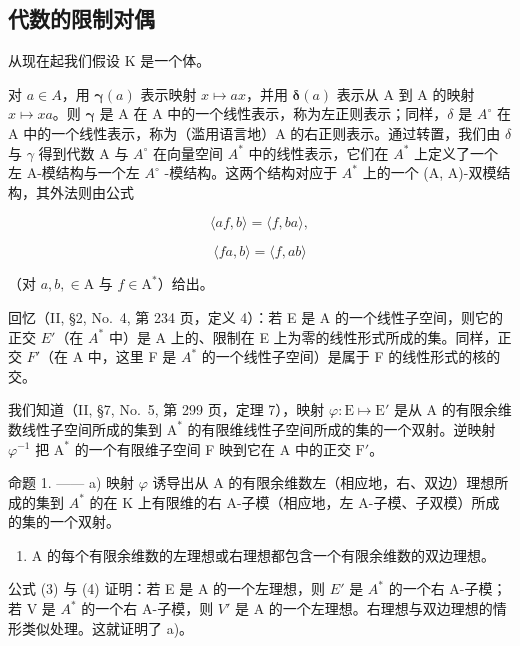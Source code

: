 \subsection{代数的限制对偶}

从现在起我们假设 K 是一个体。

对 \(a \in A\)，用 \(\boldsymbol{\gamma}(a)\) 表示映射 \(x \mapsto ax\)，并用 \(\boldsymbol{\delta}(a)\) 表示从 A 到 A 的映射 \(x \mapsto xa\)。则 \(\boldsymbol{\gamma}\) 是 A 在 A 中的一个线性表示，称为左正则表示；同样，\(\delta\) 是 \(A^{\circ}\) 在 A 中的一个线性表示，称为（滥用语言地）A 的右正则表示。通过转置，我们由 \(\delta\) 与 \(\gamma\) 得到代数 A 与 \(A^{\circ}\) 在向量空间 \(A^{*}\) 中的线性表示，它们在 \(A^{*}\) 上定义了一个左 A-模结构与一个左 \(A^{\circ}\) -模结构。这两个结构对应于 \(A^{*}\) 上的一个 (A, A)-双模结构，其外法则由公式

\[
\langle a f, b \rangle = \langle f, b a \rangle ,\tag{3}
\]

\[
\langle f a, b \rangle = \langle f, a b \rangle\tag{4}
\]

（对 \(a, b, \in \mathrm{A}\) 与 \(f \in \mathrm{A}^*\)）给出。

回忆（II, §2, No.~4, 第 234 页，定义 4）：若 E 是 A 的一个线性子空间，则它的正交 \(E'\)（在 \(A^{*}\) 中）是 A 上的、限制在 E 上为零的线性形式所成的集。同样，正交 \(F'\)（在 A 中，这里 F 是 \(A^{*}\) 的一个线性子空间）是属于 F 的线性形式的核的交。

我们知道（II, §7, No.~5, 第 299 页，定理 7），映射 \(\varphi : \mathrm{E} \mapsto \mathrm{E}'\) 是从 A 的有限余维数线性子空间所成的集到 \(\mathrm{A}^*\) 的有限维线性子空间所成的集的一个双射。逆映射 \(\varphi^{-1}\) 把 \(\mathrm{A}^*\) 的一个有限维子空间 F 映到它在 A 中的正交 \(\mathrm{F}'\)。

命题 1. —— a) 映射 \(\varphi\) 诱导出从 A 的有限余维数左（相应地，右、双边）理想所成的集到 \(A^{*}\) 的在 K 上有限维的右 A-子模（相应地，左 A-子模、子双模）所成的集的一个双射。

\begin{enumerate}
\def\labelenumi{\alph{enumi})}
\setcounter{enumi}{1}
\tightlist
\item
  A 的每个有限余维数的左理想或右理想都包含一个有限余维数的双边理想。
\end{enumerate}

公式 (3) 与 (4) 证明：若 E 是 A 的一个左理想，则 \(E'\) 是 \(A^{*}\) 的一个右 A-子模；若 V 是 \(A^{*}\) 的一个右 A-子模，则 \(V'\) 是 A 的一个左理想。右理想与双边理想的情形类似处理。这就证明了 a)。

